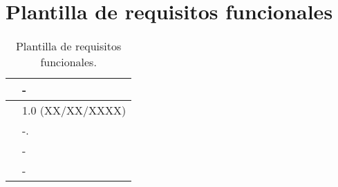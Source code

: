 \section{Plantilla de requisitos funcionales}

\begin{table}[H]
\begin{center}
\begin{tabular}{|p{3cm}|p{10cm}|} \hline
\centering {\bf FRQ-XX} & -  \\ \hline\hline
\centering {\bf Versión} & 1.0 (XX/XX/XXXX) \\ \hline
\centering {\bf Descripción} &  -. \\ \hline
\centering {\bf Importancia} & - \\ \hline
\centering {\bf Urgencia} & - \\ \hline
\end{tabular}
\caption{Plantilla de requisitos funcionales.}
\label{enlaceFRQX}
\end{center}
\end{table}